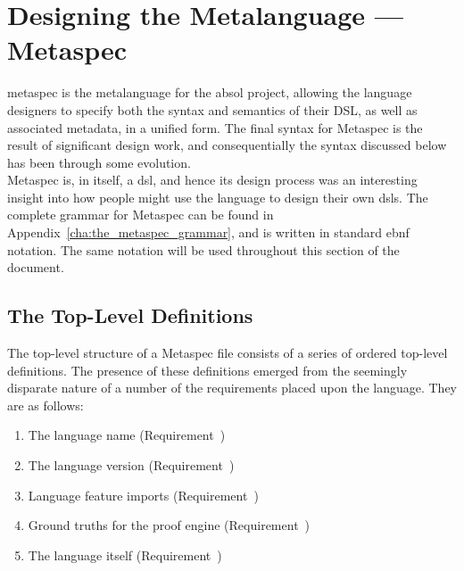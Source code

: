\section{Designing the Metalanguage --- Metaspec} %
\label{sec:designing_the_metalanguage_metaspec}

\gls{metaspec} is the metalanguage for the \gls{absol} project, allowing the language designers to specify both the syntax and semantics of their DSL, as well as associated metadata, in a unified form. 
The final syntax for Metaspec is the result of significant design work, and consequentially the syntax discussed below has been through some evolution. \\

Metaspec is, in itself, a \gls{dsl}, and hence its design process was an interesting insight into how people might use the language to design their own \glspl{dsl}. 
The complete grammar for Metaspec can be found in Appendix~\ref{cha:the_metaspec_grammar}, and is written in standard \gls{ebnf} notation. 
The same notation will be used throughout this section of the document. 

\subsection{The Top-Level Definitions} %
\label{sub:the_top_level_definitions}
The top-level structure of a Metaspec file consists of a series of ordered top-level definitions.
The presence of these definitions emerged from the seemingly disparate nature of a number of the requirements placed upon the language.
They are as follows:
\begin{enumerate}
    \item The language name (Requirement~)
    \item The language version (Requirement~)
    \item Language feature imports (Requirement~)
    \item Ground truths for the proof engine (Requirement~)
    \item The language itself (Requirement~)
\end{enumerate}

